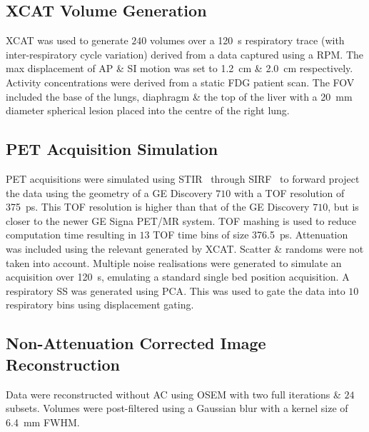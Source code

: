     \subsection{XCAT Volume Generation} \label{sec:xcat_volume_generation}
        \gls{XCAT}%
        was used to generate $240$ volumes over a \SI{120}{\second} respiratory trace (with inter-respiratory cycle variation) derived from a data captured using a \gls{RPM}. The max displacement of \gls{AP} \& \gls{SI} motion was set to \SI{1.2}{\centi\metre} \& \SI{2.0}{\centi\metre} respectively. Activity concentrations were derived from a static \gls{FDG} patient scan. The \gls{FOV} included the base of the lungs, diaphragm \& the top of the liver with a \SI{20}{\milli\metre} diameter spherical lesion placed into the centre of the right lung.
    
    \subsection{PET Acquisition Simulation} \label{sec:pet_acquisition_simulation}
        \gls{PET} acquisitions were simulated %
        using \gls{STIR}~\cite{Thielemans2012, Efthimiou2018} through \gls{SIRF}~\cite{ Ovtchinnikov2019CCPPETMRSIRF} to forward project the data using the geometry of a \gls{GE} Discovery $710$ with a \gls{TOF} resolution of \SI{375}{\pico\second}. This \gls{TOF} resolution is higher than that of the \gls{GE} Discovery $710$, but is closer to the newer \gls{GE} Signa \gls{PET}/\gls{MR} system. \gls{TOF} mashing is used to reduce computation time resulting in $13$ \gls{TOF} time bins of size \SI{376.5}{\pico\second}. Attenuation was included using the relevant  generated by \gls{XCAT}. Scatter \& randoms were not taken into account. Multiple noise realisations were generated to simulate an acquisition over \SI{120}{\second}, emulating a standard single bed position acquisition. A respiratory \gls{SS} was generated using \gls{PCA}.%
        This was used to gate the data into $10$ respiratory bins using displacement gating.%
    
    \subsection{Non-Attenuation Corrected Image Reconstruction} \label{sec:non-attenuation_corrected_image_reconstruction}
        Data were reconstructed without \gls{AC} using \gls{OSEM} with two full iterations \& $24$ subsets.%
        Volumes were post-filtered using a Gaussian blur with a kernel size of \SI{6.4}{\milli\metre} \gls{FWHM}.
    

